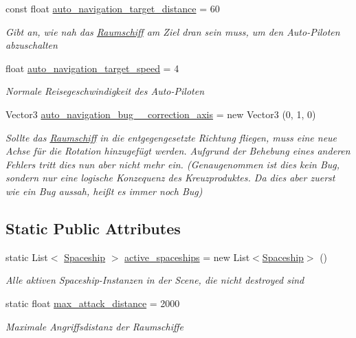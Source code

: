 \begin{DoxyCompactItemize}
const float \hyperlink{class_spaceship_a14d21edf96d6a77e14d975b506275e7e}{auto\+\_\+navigation\+\_\+target\+\_\+distance} = 60
\begin{DoxyCompactList}\small\item\em Gibt an, wie nah das \hyperlink{class_raumschiff}{Raumschiff} am Ziel dran sein muss, um den Auto-\/\+Piloten abzuschalten \end{DoxyCompactList}\item 
float \hyperlink{class_spaceship_a6190772ff13072113beda25fcc6469ce}{auto\+\_\+navigation\+\_\+target\+\_\+speed} = 4
\begin{DoxyCompactList}\small\item\em Normale Reisegeschwindigkeit des Auto-\/\+Piloten \end{DoxyCompactList}\item 
Vector3 \hyperlink{class_spaceship_ac19d442ae4d44180f76a3875ec0a496b}{auto\+\_\+navigation\+\_\+bug\+\_\+\_\+correction\+\_\+axis} = new Vector3 (0, 1, 0)
\begin{DoxyCompactList}\small\item\em Sollte das \hyperlink{class_raumschiff}{Raumschiff} in die entgegengesetzte Richtung fliegen, muss eine neue Achse für die Rotation hinzugefügt werden. Aufgrund der Behebung eines anderen Fehlers tritt dies nun aber nicht mehr ein. (Genaugenommen ist dies kein Bug, sondern nur eine logische Konzequenz des Kreuzproduktes. Da dies aber zuerst wie ein Bug aussah, heißt es immer noch Bug) \end{DoxyCompactList}\end{DoxyCompactItemize}
\subsection*{Static Public Attributes}
\begin{DoxyCompactItemize}
\item 
static List$<$ \hyperlink{class_spaceship}{Spaceship} $>$ \hyperlink{class_spaceship_a5958b60df7a824952944bfa3c201676f}{active\+\_\+spaceships} = new List$<$\hyperlink{class_spaceship}{Spaceship}$>$ ()
\begin{DoxyCompactList}\small\item\em Alle aktiven Spaceship-\/\+Instanzen in der Scene, die nicht destroyed sind \end{DoxyCompactList}\item 
static float \hyperlink{class_spaceship_a1e950732e18a6aa13fbbc4b24bce7fe6}{max\+\_\+attack\+\_\+distance} = 2000
\begin{DoxyCompactList}\small\item\em Maximale Angriffsdistanz der Raumschiffe \end{DoxyCompactList}\end{DoxyCompactItemize}
